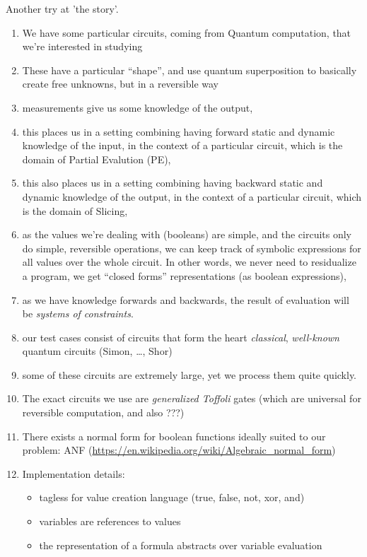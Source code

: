 \documentclass[sigplan]{acmart}
\begin{document}
Another try at 'the story'.
\begin{enumerate}
  \item We have some particular circuits, coming from Quantum computation,
    that we're interested in studying
  \item These have a particular ``shape'', and use quantum superposition to 
    basically create free unknowns, but in a reversible way
  \item measurements give us some knowledge of the output,
  \item this places us in a setting combining having forward static and
    dynamic knowledge of the input, in the context of a particular circuit,
    which is the domain of Partial Evalution (PE),
  \item this also places us in a setting combining having backward static and
    dynamic knowledge of the output, in the context of a particular circuit,
    which is the domain of Slicing,
  \item as the values we're dealing with (booleans) are simple, and the
    circuits only do simple, reversible operations, we can keep track of
    symbolic expressions for all values over the whole circuit. In other
    words, we never need to residualize a program, we get ``closed forms''
    representations (as boolean expressions),
  \item as we have knowledge forwards and backwards, the result of
    evaluation will be \emph{systems of constraints}.
  \item our test cases consist of circuits that form the heart \emph{classical},
    \emph{well-known} quantum circuits (Simon, \ldots, Shor)
  \item some of these circuits are extremely large, yet we process them quite
    quickly.
  \item The exact circuits we use are \emph{generalized Toffoli} gates (which
    are universal for reversible computation, and also ???)
  \item There exists a normal form for boolean functions ideally suited to our problem:
    ANF (\url{https://en.wikipedia.org/wiki/Algebraic_normal_form})
  \item Implementation details:
    \begin{itemize}
      \item tagless for value creation language (true, false, not, xor, and)
      \item variables are references to values
      \item the representation of a formula abstracts over variable evaluation 

\end{itemize}
\end{enumerate}
\end{document}
